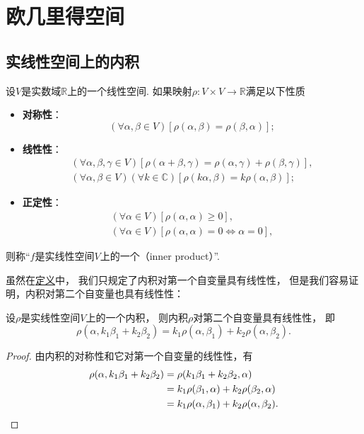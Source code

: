\section{欧几里得空间}
\subsection{实线性空间上的内积}
\begin{definition}\label{definition:欧几里得空间.实线性空间上的内积}
设\(V\)是实数域\(\mathbb{R}\)上的一个线性空间.
如果映射\(\rho\colon V \times V \to \mathbb{R}\)满足以下性质\begin{itemize}
	\item {\rm\bf 对称性}：\begin{equation*}
		(\forall \alpha,\beta \in V)
		[
			\rho(\alpha,\beta)
			= \rho(\beta,\alpha)
		];
	\end{equation*}

	\item {\rm\bf 线性性}：\begin{gather*}
		(\forall \alpha,\beta,\gamma \in V)
		[
			\rho(\alpha+\beta,\gamma)
			= \rho(\alpha,\gamma) + \rho(\beta,\gamma)
		], \\
		(\forall \alpha,\beta \in V)
		(\forall k \in \mathbb{C})
		[
			\rho(k\alpha,\beta)
			= k\rho(\alpha,\beta)
		];
	\end{gather*}

	\item {\rm\bf 正定性}：\begin{gather*}
		(\forall \alpha \in V)
		[
			\rho(\alpha,\alpha) \geq 0
		], \\
		(\forall \alpha \in V)
		[
			\rho(\alpha,\alpha) = 0
			\iff
			\alpha = 0
		],
	\end{gather*}
\end{itemize}
则称“\(f\)是实线性空间\(V\)上的一个（inner product）”.
\end{definition}

虽然在\hyperref[definition:欧几里得空间.实线性空间上的内积]{定义}中，
我们只规定了内积对第一个自变量具有线性性，
但是我们容易证明，内积对第二个自变量也具有线性性：
\begin{property}\label{theorem:实线性空间.实线性空间上内积对第二个自变量具有线性性}
设\(\rho\)是实线性空间\(V\)上的一个内积，
则内积\(\rho\)对第二个自变量具有线性性，
即\begin{equation}
	\rho(\alpha,k_1\beta_1+k_2\beta_2)
	= k_1 \rho(\alpha,\beta_1)
	+ k_2 \rho(\alpha,\beta_2).
\end{equation}
\begin{proof}
由内积的对称性和它对第一个自变量的线性性，有\begin{align*}
	\rho(\alpha,k_1\beta_1+k_2\beta_2)
	&= \rho(k_1\beta_1+k_2\beta_2,\alpha) \\
	&= k_1 \rho(\beta_1,\alpha)
		+ k_2 \rho(\beta_2,\alpha) \\
	&= k_1 \rho(\alpha,\beta_1)
		+ k_2 \rho(\alpha,\beta_2).
	\qedhere
\end{align*}
\end{proof}
\end{property}

